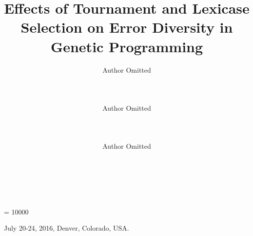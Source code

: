 \documentclass{sig-alternate-05-2015}
\begin{document}

\widowpenalty = 10000


 {July 20-24, 2016, Denver, Colorado, USA.}


%



\title{Effects of Tournament and Lexicase Selection on Error Diversity in Genetic Programming}

%
%
%
%
%

%
\author{
\alignauthor
Author Omitted\\
       \\
       \\
       \\
\alignauthor
Author Omitted\\
       \\
       \\
       \\
\alignauthor
Author Omitted\\
       \\
       \\
       \\
}
\end{document}
